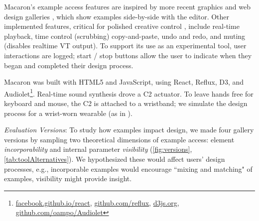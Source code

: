 Macaron's example access features are inspired by more recent graphics and web design galleries \cite{Marks1997,Lee2010a,Ritchie2011}, which show examples side-by-side with the editor.
Other implemented features, critical for polished creative control \cite{Schneider2015}, include real-time playback, time control (scrubbing) %
copy-and-paste, undo and redo, and muting (disables realtime VT output).
%
To support its use as an experimental tool, user interactions are logged; 
start / stop buttons allow the user to indicate when they began and completed their design process.

 
Macaron was built with HTML5 and JavaScript, using React, Reflux, D3, and
Audiolet\footnote{\url{facebook.github.io/react}, \url{github.com/reflux}, \url{d3js.org}, \url{github.com/oampo/Audiolet}}. Real-time sound synthesis drove a C2 actuator.
To leave %
hands free for keyboard and mouse, the C2 is attached to a wristband; we simulate the design process for a wrist-worn wearable (as in \cite{Seifi2015}).


%
%

\emph{Evaluation Versions}: To study how examples impact design, we made four gallery versions by sampling two theoretical dimensions of example access:
element \emph{incorporability} and internal parameter \emph{visibility} (\autoref{fig:versions}, \autoref{tab:toolAlternatives}).
We hypothesized these would affect users' design processes, e.g., incorporable examples would encourage ``mixing and matching" of examples, visibility might provide insight.

